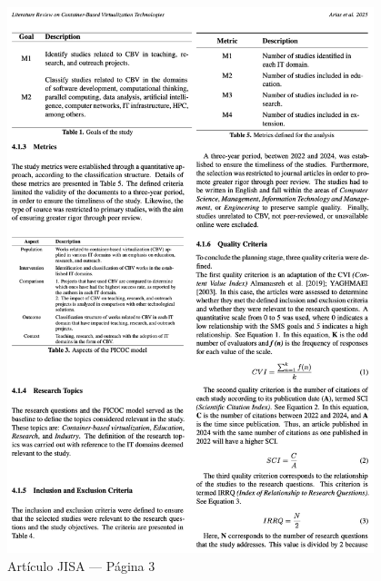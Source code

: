 \begin{figure}[H]
    \centering
    \begin{tcolorbox}[
        colback=white,
        colframe=gray!50,
        boxrule=1pt,
        arc=2pt,
        boxsep=5pt,
        left=3pt,
        right=3pt,
        top=3pt,
        bottom=3pt,
        drop shadow
    ]
        \includegraphics[width=0.95\textwidth,keepaspectratio]{apendices/JISA/pagina_3.png}
    \end{tcolorbox}
    \caption{Artículo JISA --- Página 3}\label{fig:jisa-pagina-3}
\end{figure}
\FloatBarrier%
